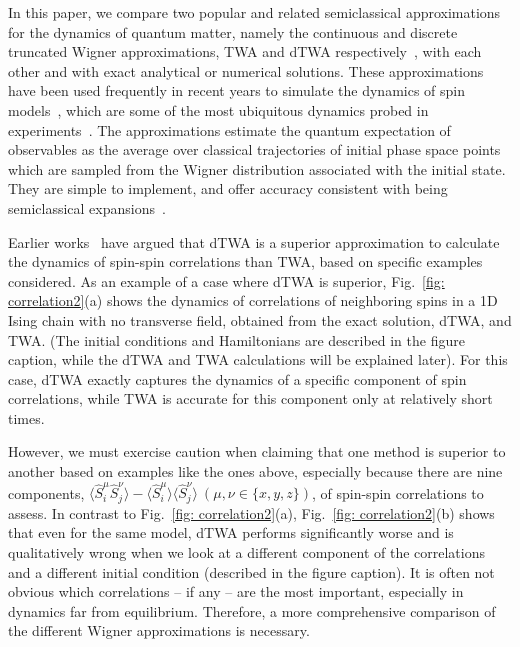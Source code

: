 \documentclass[pra,reprint,superscriptaddress]{revtex4-1}
\newcommand{\hS}{\hat{S}}
\begin{document}
In this paper, we compare two popular and related semiclassical approximations for the dynamics of quantum matter, namely the continuous and discrete truncated Wigner approximations, TWA and dTWA respectively~\cite{wootters1987wigner, polkovnikov2003quantum, polkovnikov2010phase, schachenmayer2015many}, with each other and with exact analytical or numerical solutions.
These approximations have been used frequently in recent years to simulate the dynamics of spin models~\cite{schachenmayer2015many, schachenmayer2015dynamics, pucci2016simulation, orioli2017nonequilibrium, orioli2018relaxation, babadi2015far, valtierra2017twa, czischek2018quenches, wurtz2018cluster}, which are some of the most ubiquitous dynamics probed in experiments~\cite{kim2010quantum, islam2013emergence, britton2012engineered, bohnet2016quantum, de2013nonequilibrium, de2016probing, zeiher2016many, mukherjee2016accessing, low2009universal, takei2016direct, guardado2017probing, nichols2018spin, lienhard2017observing, hazzard2014many, garttner2017measuring}. The approximations estimate the quantum expectation of observables as the average over classical trajectories of initial phase space points which are sampled from the Wigner distribution associated with the initial state. They are simple to implement, and offer accuracy consistent with being semiclassical expansions~\cite{schachenmayer2015many, schachenmayer2015dynamics, pucci2016simulation}.

Earlier works~\cite{schachenmayer2015many, schachenmayer2015dynamics} have argued that dTWA is a superior approximation to calculate the dynamics of spin-spin correlations than TWA, based on specific examples considered. As an example of a case where dTWA is superior, Fig.~\ref{fig: correlation2}(a) shows the dynamics of correlations of neighboring spins in a 1D Ising chain with no transverse field, obtained from the exact solution, dTWA, and TWA. (The initial conditions and Hamiltonians are described in the figure caption, while the dTWA and TWA calculations will be explained later). For this case, dTWA exactly captures the dynamics of a specific component of spin correlations, while TWA is accurate for this component only at relatively short times.

However, we must exercise caution when claiming that one method is superior to another based on examples like the ones above, especially because there are nine components, $\langle\hS^{\mu}_i\hS^\nu_j\rangle-\langle\hS^\mu_i\rangle\langle\hS^\nu_j\rangle\ (\mu,\nu\in\{x,y,z\})$, of spin-spin correlations to assess. In contrast to Fig.~\ref{fig: correlation2}(a), Fig.~\ref{fig: correlation2}(b) shows that even for the same model, dTWA performs significantly worse and is qualitatively wrong when we look at a different component of the correlations and a different initial condition (described in the figure caption). It is often not obvious which correlations -- if any -- are the most important, especially in dynamics far from equilibrium. Therefore, a more comprehensive comparison of the different Wigner approximations is necessary.
\end{document}
